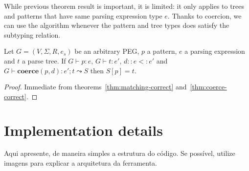 While previous theorem result is important, it is limited: it only applies to
trees and patterns that have same parsing expression type $e$. Thanks to coercion,
we can use the algorithm whenever the pattern and tree types does satisfy the
subtyping relation.

\begin{corollary}
Let $G = (V,\Sigma,R, e_s)$ be an arbitrary PEG, $p$ a pattern,
$e$ a parsing expression and $t$ a parse tree. If $G \vdash p : e$, $G \vdash t : e'$,
  $d :: e <: e'$ and $G\vdash \mathbf{coerce}(p,d) : e' ; t \leadsto S$ then $S[p] = t$.
\end{corollary}
\begin{proof}
  Immediate from theorems~\ref{thm:matching-correct} and~\ref{thm:coerce-correct}.
\end{proof}

\section{Implementation details}

Aqui apresente, de maneira simples a estrutura do código. Se possível, utilize imagens para
explicar a arquitetura da ferramenta.




